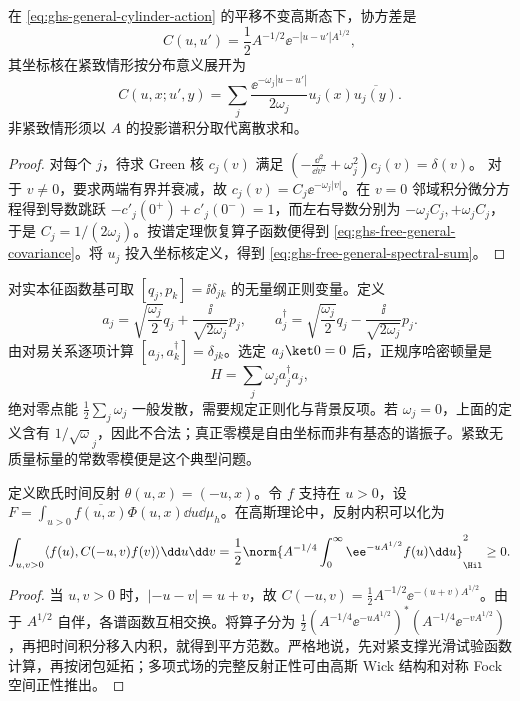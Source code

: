 \begin{theorem}[任意正自伴截面的欧氏两点核]
\label{thm:ghs-free-two-point-general}
在 \cref{eq:ghs-general-cylinder-action} 的平移不变高斯态下，协方差是
\begin{equation}\label{eq:ghs-free-general-covariance}
 C(u,u')=\frac12A^{-1/2}\ee^{-|u-u'|A^{1/2}},
\end{equation}
其坐标核在紧致情形按分布意义展开为
\begin{equation}\label{eq:ghs-free-general-spectral-sum}
 C(u,x;u',y)=\sum_j\frac{\ee^{-\omega_j|u-u'|}}{2\omega_j}
 u_j(x)\overline{u_j(y)}.
\end{equation}
非紧致情形须以 $A$ 的投影谱积分取代离散求和。
\end{theorem}
\begin{proof}
对每个 $j$，待求 Green 核 $c_j(v)$ 满足
$(-\frac{\dd^2}{\dd v^2}+\omega_j^2)c_j(v)=\delta(v)$。
对于 $v\neq 0$，要求两端有界并衰减，故 $c_j(v)=C_j\ee^{-\omega_j|v|}$。在 $v=0$ 邻域积分微分方程得到导数跳跃
$-c'_j(0^+)+c'_j(0^-)=1$，而左右导数分别为 $-\omega_j C_j,+\omega_jC_j$，于是 $C_j=1/(2\omega_j)$。按谱定理恢复算子函数便得到 \cref{eq:ghs-free-general-covariance}。将 $u_j$ 投入坐标核定义，得到 \cref{eq:ghs-free-general-spectral-sum}。
\end{proof}


对实本征函数基可取 $[q_j,p_k]=\ii\delta_{jk}$ 的无量纲正则变量。定义
\[
 a_j=\sqrt{\frac{\omega_j}{2}}q_j+\frac{\ii}{\sqrt{2\omega_j}}p_j,
 \qquad a_j^\dagger=\sqrt{\frac{\omega_j}{2}}q_j-\frac{\ii}{\sqrt{2\omega_j}}p_j.
\]
由对易关系逐项计算 $[a_j,a_k^\dagger]=\delta_{jk}$。选定 $a_j\ket0=0$ 后，正规序哈密顿量是
\begin{equation}\label{eq:ghs-general-cylinder-hamiltonian}
 H=\sum_j\omega_ja_j^\dagger a_j,
\end{equation}
绝对零点能 $\frac12\sum_j\omega_j$ 一般发散，需要规定正则化与背景反项。若 $\omega_j=0$，上面的定义含有 $1/\sqrt\omega_j$，因此不合法；真正零模是自由坐标而非有基态的谐振子。紧致无质量标量的常数零模便是这个典型问题。


定义欧氏时间反射 $\theta(u,x)=(-u,x)$。令 $f$ 支持在 $u>0$，设
$F=\int_{u>0}\overline{f(u,x)}\Phi(u,x)\dd u\dd\mu_h$。在高斯理论中，反射内积可以化为
\begin{equation}\label{eq:ghs-reflection-positive-quadratic}
 \int_{u,v>0}\langle f(u),C(-u,v)f(v)\rangle\dd u\dd v
 =\frac12\norm{A^{-1/4}\int_0^\infty\ee^{-uA^{1/2}}f(u)\dd u}_{\Hil}^2\geq0.
\end{equation}
\begin{proof}
当 $u,v>0$ 时，$|-u-v|=u+v$，故 $C(-u,v)=\frac12A^{-1/2}\ee^{-(u+v)A^{1/2}}$。由于 $A^{1/2}$ 自伴，各谱函数互相交换。将算子分为
$\frac12(A^{-1/4}\ee^{-uA^{1/2}})^*(A^{-1/4}\ee^{-vA^{1/2}})$，再把时间积分移入内积，就得到平方范数。严格地说，先对紧支撑光滑试验函数计算，再按闭包延拓；多项式场的完整反射正性可由高斯 Wick 结构和对称 Fock 空间正性推出。
\end{proof}

